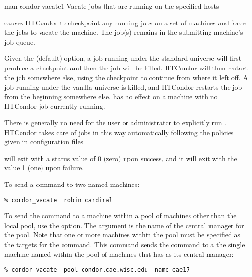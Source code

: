 \begin{ManPage}{}{man-condor-vacate}{1}
{Vacate jobs that are running on the specified hosts}

\Synopsis {}
\ToolArgsBase

\ToolDebugOption
\ToolWhere

\Description
{} causes HTCondor to checkpoint any running jobs
on a set of machines
and force the jobs to vacate the machine.
The job(s) remains in
the submitting machine's job queue. 

Given the (default)  option,
a job running under the standard universe
will first produce a checkpoint and then the job will be killed.
HTCondor will then restart the job somewhere else, using the checkpoint to
continue from where it left off.
A job running under the vanilla universe
is killed, and HTCondor
restarts the job from the beginning somewhere else.
 has no effect on a machine with 
no HTCondor job currently running. 

There is generally no need for the user or administrator to explicitly run
.
HTCondor takes care of jobs in this way
automatically following the policies given in configuration files.   

\begin{Options}
	\ToolArgsBaseDesc
	\ToolDebugDesc
	\ToolArgsLocateDesc
\end{Options}

\ExitStatus

 will exit with a status value of 0 (zero) upon success,
and it will exit with the value 1 (one) upon failure.

\Examples
To send a  command to two named machines:
\begin{verbatim}
% condor_vacate  robin cardinal
\end{verbatim}

To send the  command to a machine
within a pool of machines other than the local pool,
use the  option.
The argument is the name of the central manager for the pool.
Note that one or more machines within the pool must be
specified as the targets for the command.
This command sends the command to
a the single machine named  within the
pool of machines that has  as
its central manager:
\begin{verbatim}
% condor_vacate -pool condor.cae.wisc.edu -name cae17
\end{verbatim}

\end{ManPage}
